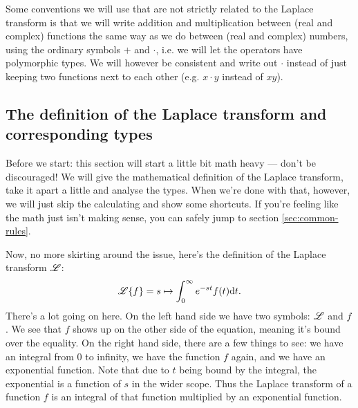 Some conventions we will use that are not strictly related to the Laplace
transform is that we will write addition and multiplication between (real and complex) functions
the same way as we do between (real and complex) numbers, using the ordinary
symbols $+$ and $\cdot$, i.e. we will let the operators have polymorphic types. 
We will however be consistent and write out $\cdot$ instead of just keeping two
functions next to each other (e.g. $x \cdot y$ instead of $xy$).

\subsection{The definition of the Laplace transform and corresponding types}
Before we start: this section will start a little bit math heavy --- don't be
discouraged! We will give the mathematical definition of the Laplace transform,
take it apart a little and analyse the types. When we're done with that,
however, we will just skip the calculating and show some shortcuts. If you're
feeling like the math just isn't making sense, you can safely jump to section
\ref{sec:common-rules}. 

Now, no more skirting around the issue, here's the definition of the Laplace
transform $\mathscr{L}$: 
\begin{equation*}
 \mathscr{L} \{f\} = s \mapsto \int_0^\infty e^{-st}f(t) \dd t. 
\end{equation*}
There's a lot going on here. On the left hand side we have two symbols: $\mathscr{L}$
and $f$. We see that $f$ shows up on the other side of the equation, meaning
it's bound over the equality. On the right hand side, there are a few things to
see: we have an integral from $0$ to infinity, we have the function $f$ again,
and we have an exponential function. Note that due to $t$ being bound by the
integral, the exponential is a function of $s$ in the wider scope. 
Thus the Laplace transform of a function $f$ is an integral of that function
multiplied by an exponential function.

